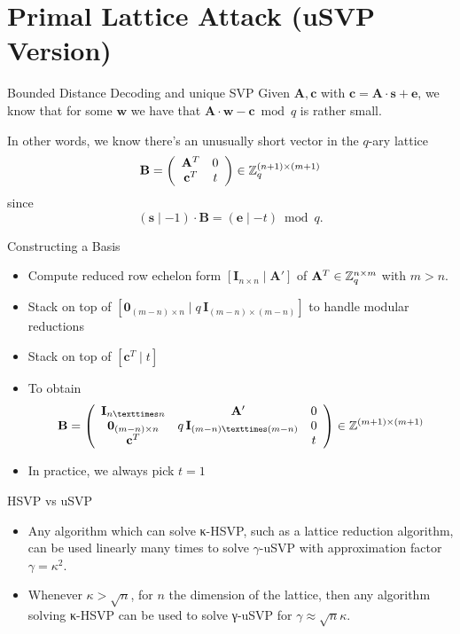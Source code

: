 \documentclass[presentation,smaller]{beamer}
\renewcommand{\vec}[1]{\mathbf{#1}\xspace}
\begin{document}
\section{Primal Lattice Attack (uSVP Version)}
\label{sec:org384d800}
\begin{frame}[label={sec:org3e8537a}]{Bounded Distance Decoding and unique SVP}
Given \(\vec{A}, \vec{c}\) with \(\vec{c} = \vec{A} ⋅ \vec{s} + \vec{e}\), we know that for some \(\vec{w}\) we have that \(\vec{A}⋅\vec{w} - \vec{c} \bmod q\) is rather small.

In other words, we know there’s an unusually short vector in the \(q\)-ary lattice \[\vec{B}=\left(\begin{array}{cc}
          \vec{A}^T &  0 \\
          \vec{c}^T   & t \\
        \end{array} \right) \in \ZZ_q^{(n+1) \times (m+1)}\] since \[(\vec{s} \mid -1) ⋅ \vec{B} = (\vec{e} \mid -t) \bmod q.\]
\end{frame}

\begin{frame}[label={sec:org7874207}]{Constructing a Basis}
\begin{itemize}
\item Compute reduced row echelon form \([\vec{I}_{n × n} \mid \vec{A}']\) of \(\vec{A}^T \in \ZZ_q^{n \times m}\) with \(m>n\).
\item Stack on top of \([\vec{0}_{(m-n) \times n} \mid q\,\vec{I}_{(m-n) × (m-n)}]\) to handle modular reductions
\item Stack on top of \([\vec{c}^T \mid t]\)
\item To obtain \[\vec{B}=\left(\begin{array}{ccc}
         \vec{I}_{n × n} & \vec{A}' &  0 \\
         \vec{0}_{(m-n) \times n} & q\,\vec{I}_{(m-n) × (m-n)} & 0\\
          \vec{c}^T  & & t \\
        \end{array} \right) \in \ZZ^{(m+1) \times (m+1)}\]
\item In practice, we always pick \(t=1\)
\end{itemize}
\end{frame}

\begin{frame}[label={sec:org89e697c}]{HSVP vs uSVP}
\begin{itemize}
\item Any algorithm which can solve κ-HSVP, such as a lattice reduction algorithm, can be used linearly many times to solve \(γ\)-uSVP with approximation factor \(γ=κ^2\).
\item Whenever \(κ > \sqrt{n}\), for \(n\) the dimension of the lattice, then any algorithm solving κ-HSVP can be used to solve γ-uSVP for \(γ ≈ \sqrt{n} κ\).
\end{itemize}
\end{frame}
\end{document}
